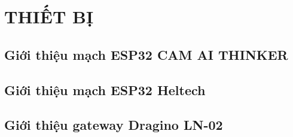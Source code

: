 


\chapter{THIẾT BỊ}
\label{chap:application}

\section{Giới thiệu mạch ESP32 CAM AI THINKER}

\section{Giới thiệu mạch ESP32 Heltech}

\section{Giới thiệu gateway Dragino LN-02}



